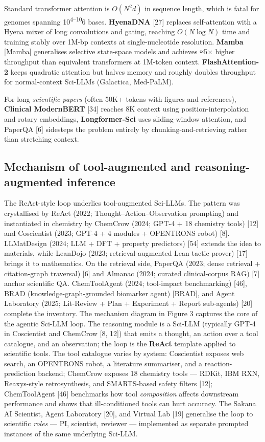 Standard transformer attention is \(O(N^2 d)\) in sequence length, which is fatal for genomes spanning 10\textsuperscript{4--10}6 bases. \textbf{HyenaDNA} {[}27{]} replaces self-attention with a Hyena mixer of long convolutions and gating, reaching \(O(N \log N)\) time and training stably over 1M-bp contexts at single-nucleotide resolution. \textbf{Mamba} {[}Mamba{]} generalises selective state-space models and achieves ≈5× higher throughput than equivalent transformers at 1M-token context. \textbf{FlashAttention-2} keeps quadratic attention but halves memory and roughly doubles throughput for normal-context Sci-LLMs (Galactica, Med-PaLM).

For long \emph{scientific papers} (often 50K+ tokens with figures and references), \textbf{Clinical ModernBERT} {[}34{]} reaches 8K context using position-interpolation and rotary embeddings, \textbf{Longformer-Sci} uses sliding-window attention, and PaperQA {[}6{]} sidesteps the problem entirely by chunking-and-retrieving rather than stretching context.

\subsection{Mechanism of tool-augmented and reasoning-augmented inference}\label{mechanism-of-tool-augmented-and-reasoning-augmented-inference}

The ReAct-style loop underlies tool-augmented Sci-LLMs. The pattern was crystallised by ReAct (2022; Thought--Action--Observation prompting) and instantiated in chemistry by ChemCrow (2024; GPT-4 + 18 chemistry tools) {[}12{]} and Coscientist (2023; GPT-4 + 4 modules + OPENTRONS robot) {[}8{]}. LLMatDesign (2024; LLM + DFT + property predictors) {[}54{]} extends the idea to materials, while LeanDojo (2023; retrieval-augmented Lean tactic prover) {[}17{]} brings it to mathematics. On the retrieval side, PaperQA (2023; dense retrieval + citation-graph traversal) {[}6{]} and Almanac (2024; curated clinical-corpus RAG) {[}7{]} anchor scientific QA. ChemToolAgent (2024; tool-impact benchmarking) {[}46{]}, BRAD (knowledge-graph-grounded biomarker agent) {[}BRAD{]}, and Agent Laboratory (2025; Lit-Review + Plan + Experiment + Report sub-agents) {[}20{]} complete the inventory. The mechanism diagram in Figure 3 captures the core of the agentic Sci-LLM loop. The reasoning module is a Sci-LLM (typically GPT-4 in Coscientist and ChemCrow {[}8, 12{]}) that emits a thought, an action over a tool catalogue, and an observation; the loop is the \textbf{ReAct} template applied to scientific tools. The tool catalogue varies by system: Coscientist exposes web search, an OPENTRONS robot, a literature summariser, and a reaction-prediction backend; ChemCrow exposes 18 chemistry tools --- RDKit, IBM RXN, Reaxys-style retrosynthesis, and SMARTS-based safety filters {[}12{]}; ChemToolAgent {[}46{]} benchmarks how tool \emph{composition} affects downstream performance and shows that ill-conditioned tools can hurt accuracy. The Sakana AI Scientist, Agent Laboratory {[}20{]}, and Virtual Lab {[}19{]} generalise the loop to scientific \emph{roles} --- PI, scientist, reviewer --- implemented as separate prompted instances of the same underlying Sci-LLM.

